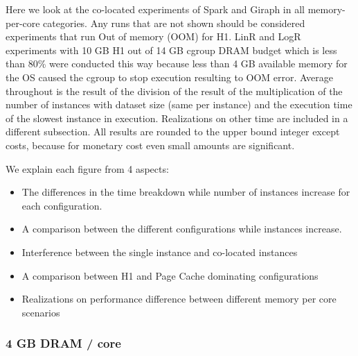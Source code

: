 Here we look at the co-located experiments of Spark and Giraph in all memory-per-core categories.
Any runs that are not shown should be considered experiments that run Out of memory (OOM) for H1.
LinR and LogR experiments with 10 GB H1 out of 14 GB cgroup DRAM budget which is less than 80\% were conducted this way
because less than 4 GB available memory for the OS caused the cgroup to stop execution resulting to OOM error.
Average throughout is the result of the division of the result of the multiplication of the number of instances with dataset size (same per instance) and the execution time of the slowest instance in execution. Realizations on other time are included in a different subsection.
All results are rounded to the upper bound integer except costs, because for monetary cost even small amounts are significant.

We explain each figure from 4 aspects:
\begin{itemize}
\item{The differences in the time breakdown while number of instances increase for each configuration.}
\item{A comparison between the different configurations while instances increase.}
\item{Interference between the single instance and co-located instances}
\item{A comparison between H1 and Page Cache dominating configurations}
\item{Realizations on performance difference between different memory per core scenarios}
\end{itemize}

\subsubsection{4 GB DRAM / core}

